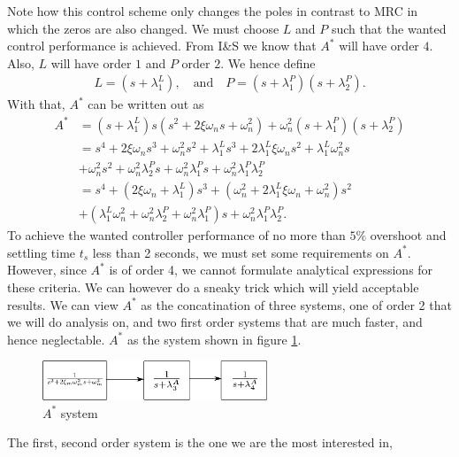 \documentclass[]{article}
\begin{document}
Note how this control scheme only changes the poles in contrast to MRC in which the zeros are also changed. We must choose $L$ and $P$ such that the wanted control performance is achieved. From I\&S we know that $A^*$ will have order $4$. Also, $L$ will have order $1$ and $P$ order $2$. We hence define
\begin{equation}\begin{aligned}
L = (s + \lambda_1^L), \quad \text{and} \quad P = (s + \lambda_1^P) (s + \lambda_2^P).
\end{aligned}\end{equation}
With that, $A^*$ can be written out as
\begin{equation}\begin{aligned}
\label{eq:A_star_really}
A^* &= (s + \lambda_1^L) s (s^2 + 2 \xi \omega_n s + \omega^2_n) + \omega^2_n (s + \lambda_1^P)(s + \lambda_2^P) \\
&= s^4 + 2 \xi \omega_n s^3 + \omega_n^2 s^2 + \lambda_1^L s^3 + 2 \lambda_1^L \xi \omega_n s^2 + \lambda_1^L \omega_n^2 s\\
&+ \omega_n^2 s^2 + \omega_n^2 \lambda_2^P s + \omega_n^2 \lambda_1^P s + \omega_n^2 \lambda_1^P \lambda_2^P\\
&= s^4 + (2 \xi \omega_n + \lambda_1^L)s^3 + (\omega_n^2 + 2 \lambda_1^L \xi \omega_n + \omega_n^2)s^2\\
&+ (\lambda_1^L \omega_n^2 + \omega_n^2 \lambda_2^P + \omega_n^2 \lambda_1^P)s + \omega_n^2 \lambda_1^P \lambda_2^P.
\end{aligned}\end{equation}
To achieve the wanted controller performance of no more than $5\%$ overshoot and settling time $t_s$ less than 2 seconds, we must set some requirements on $A^*$. However, since $A^*$ is of order 4, we cannot formulate analytical expressions for these criteria. We can however do a sneaky trick which will yield acceptable results. We can view $A^*$ as the concatination of three systems, one of order 2 that we will do analysis on, and two first order systems that are much faster, and hence neglectable. $A^*$ as the system shown in figure \ref{fig:sys}.
\begin{figure}[H]
\centering
\includegraphics[width=0.6\textwidth]{system}
\caption{$A^*$ system}
\label{fig:sys}
\end{figure}
The first, second order system is the one we are the most interested in,
\end{document}
